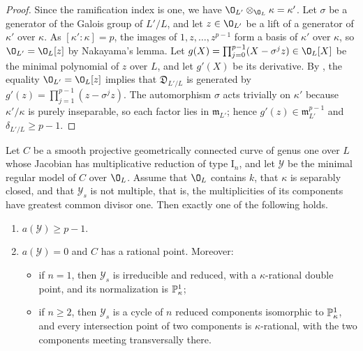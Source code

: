 \begin{proof}
Since the ramification index is one, we have $\O_{L'}\otimes_{\O_L}\kappa = \kappa'$.
Let $\sigma$ be a generator of the Galois group of $L'/L$, and let $z\in\O_{L'}$ be a lift of a generator of $\kappa'$ over $\kappa$.
As $[\kappa':\kappa] = p$, the images of $1,z,\dots,z^{p-1}$ form a basis of $\kappa'$ over $\kappa$, so $\O_{L'} = \O_L[z]$ by Nakayama's lemma.
Let $g(X) = \prod_{j=0}^{p-1}(X-\sigma^jz)\in\O_L[X]$ be the minimal polynomial of $z$ over $L$, and let $g'(X)$ be its derivative.
By \cite[III, \S6, Corollary~2 to Proposition~11]{Ser79}, the equality $\O_{L'} = \O_L[z]$ implies that $\mathfrak D_{L'/L}$ is generated by $g'(z) = \prod_{j=1}^{p-1}(z-\sigma^jz)$.
The automorphism $\sigma$ acts trivially on $\kappa'$ because $\kappa'/\kappa$ is purely inseparable, so each factor lies in $\mathfrak m_{L'}$; hence $g'(z)\in\mathfrak m_{L'}^{p-1}$ and $\delta_{L'/L}\geq p-1$.
\end{proof}

\begin{lemma}\label{lem:trivial-torsor}
Let $C$ be a smooth projective geometrically connected curve of genus one over $L$ whose Jacobian has multiplicative reduction of type $\mathrm I_n$, and let $\mathcal Y$ be the minimal regular model of $C$ over $\O_L$.
Assume that $\O_L$ contains $k$, that $\kappa$ is separably closed, and that $\mathcal Y_s$ is not multiple, that is, the multiplicities of its components have greatest common divisor one.
Then exactly one of the following holds.
\begin{enumerate}
\item $a(\mathcal Y)\geq p-1$.
\item $a(\mathcal Y) = 0$ and $C$ has a rational point.
  Moreover:
  \begin{itemize}
  \item if $n = 1$, then $\mathcal Y_s$ is irreducible and reduced, with a $\kappa$-rational double point, and its normalization is $\mathbb{P}^1_\kappa$;
  \item if $n\geq 2$, then $\mathcal Y_s$ is a cycle of $n$ reduced components isomorphic to $\mathbb{P}^1_\kappa$, and every intersection point of two components is $\kappa$-rational, with the two components meeting transversally there.
  \end{itemize}
\end{enumerate}
\end{lemma}

